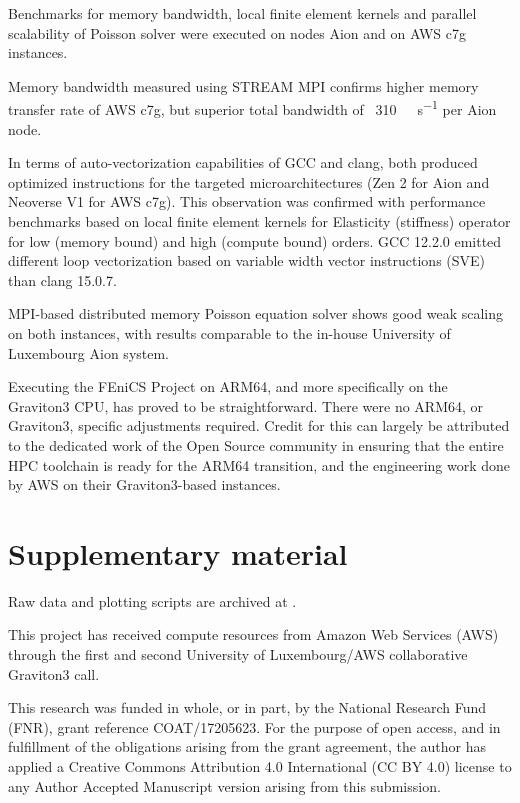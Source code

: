 Benchmarks for memory bandwidth, local finite element kernels and parallel
scalability of Poisson solver were executed on nodes Aion and on AWS c7g
instances.

Memory bandwidth measured using STREAM MPI confirms higher memory transfer rate
of AWS c7g, but superior total bandwidth of ~\SI{310}{\giga\byte\per\second} per
Aion node.

In terms of auto-vectorization capabilities of GCC and clang, both produced
optimized instructions for the targeted microarchitectures (Zen 2 for Aion and
Neoverse V1 for AWS c7g). This observation was confirmed with performance
benchmarks based on local finite element kernels for Elasticity (stiffness)
operator for low (memory bound) and high (compute bound) orders. GCC 12.2.0
emitted different loop vectorization based on variable width vector instructions
(SVE) than clang 15.0.7.

MPI-based distributed memory Poisson equation solver shows good weak scaling on
both instances, with results comparable to the in-house University of Luxembourg
Aion system.

Executing the FEniCS Project on ARM64, and more specifically on the Graviton3
CPU, has proved to be straightforward. There were no ARM64, or Graviton3,
specific adjustments required. Credit for this can largely be attributed to the
dedicated work of the Open Source community in ensuring that the entire HPC
toolchain is ready for the ARM64 transition, and the engineering work done by
AWS on their Graviton3-based instances.

\section*{Supplementary material}
Raw data and plotting scripts are archived at \cite{}.

\begin{acknowledgement}
This project has received compute resources from Amazon Web Services (AWS)
through the first and second University of Luxembourg/AWS collaborative
Graviton3 call.

This research was funded in whole, or in part, by the National Research Fund
(FNR), grant reference COAT/17205623. For the purpose of open access, and in
fulfillment of the obligations arising from the grant agreement, the author has
applied a Creative Commons Attribution 4.0 International (CC BY 4.0) license to
any Author Accepted Manuscript version arising from this submission.
\end{acknowledgement}





